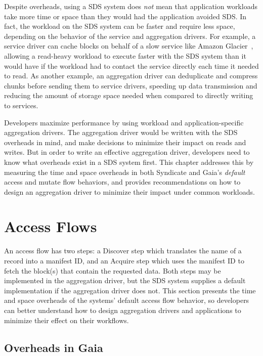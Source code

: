Despite overheads, using a SDS system does \emph{not} mean that application workloads take more time or
space than they would had the application avoided SDS.  In fact,
the workload on the SDS system can be faster and require less space,
depending on the behavior of the service and aggregation drivers.
For example, a service driver can cache blocks on behalf of a slow service like Amazon Glacier~\cite{amazon-glacier},
allowing a read-heavy workload to execute faster with the SDS system
than it would have if the workload had to contact the service directly each time
it needed to read.  As another example, an aggregation driver can deduplicate
and compress chunks before sending them to service drivers, speeding up data
transmission and reducing the amount of storage space needed when compared to
directly writing to services.

Developers maximize performance by using workload and
application-specific aggregation drivers.  The aggregation driver would be
written with the SDS overheads in mind, and make decisions to minimize their
impact on reads and writes.  But in order to write an effective aggregation
driver, developers need to know what overheads exist in a SDS system first.
This chapter addresses this by measuring the time and space overheads in both
Syndicate and Gaia's \emph{default} access and mutate flow behaviors, and
provides recommendations on how to design an aggregation driver to minimize
their impact under common workloads.

\section{Access Flows}

An access flow has two steps:  a Discover step which translates the
name of a record into a manifest ID, and an Acquire step which uses the manifest
ID to fetch the block(s) that contain the requested data.  Both steps may be
implemented in the aggregation driver, but the SDS system supplies a default
implementation if the aggregation driver does not.
This section presents the time and space overheads of the systems' default
access flow behavior, so developers can better understand how to design
aggregation drivers and applications to minimize their effect on their
workflows.

\subsection{Overheads in Gaia}

